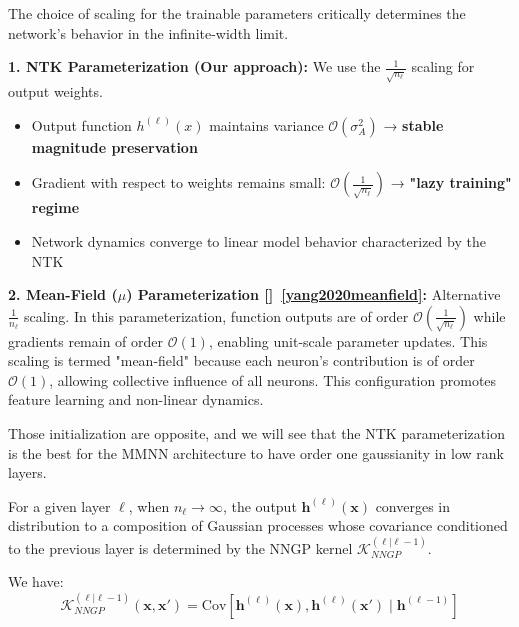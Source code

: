 \documentclass[11pt]{article}
\begin{document}
\begin{tcolorbox}[colback=green!5,colframe=green!80!black,title={\textbf{Remark: Critical Parameterization Choice}},enhanced,drop shadow,boxrule=2pt]
The choice of scaling for the trainable parameters critically determines the network's behavior in the infinite-width limit. 

\textbf{1. NTK Parameterization (Our approach):} We use the $\frac{1}{\sqrt{n_\ell}}$ scaling for output weights.
\begin{itemize}
\item Output function $h^{(\ell)}(x)$ maintains variance $\mathcal{O}(\sigma_A^2)$ → \textbf{stable magnitude preservation}
\item Gradient with respect to weights remains small: $\mathcal{O}(\frac{1}{\sqrt{n_\ell}})$ → \textbf{"lazy training" regime}
\item Network dynamics converge to linear model behavior characterized by the NTK
\end{itemize}

\textbf{2. Mean-Field ($\mu$) Parameterization []~\ref{yang2020meanfield}:} Alternative $\frac{1}{n_\ell}$ scaling.
In this parameterization, function outputs are of order $\mathcal{O}(\frac{1}{\sqrt{n_\ell}})$ while gradients remain of order $\mathcal{O}(1)$, enabling unit-scale parameter updates. This scaling is termed "mean-field" because each neuron's contribution is of order $\mathcal{O}(1)$, allowing collective influence of all neurons. This configuration promotes feature learning and non-linear dynamics.

Those initialization are opposite, and we will see that the NTK parameterization is the best for the MMNN architecture to have order one gaussianity in low rank layers.
\end{tcolorbox}






\begin{tcolorbox}[colback=yellow!5,colframe=yellow!80!black,title={\textbf{Definition: Neural Network Gaussian Process (NNGP)}},enhanced,drop shadow,boxrule=2pt]
For a given layer $\ell$, when $n_\ell \to \infty$, the output $\bm{h}^{(\ell)}(\bm{x})$ converges in 
distribution to a composition of Gaussian processes whose covariance conditioned to the previous layer is determined by the NNGP kernel $\mathcal{K}_{NNGP}^{(\ell | \ell-1)}$.

We have:
\begin{equation}
\mathcal{K}_{NNGP}^{(\ell | \ell-1 )}(\bm{x}, \bm{x}') = \text{Cov}\left[\bm{h}^{(\ell)}(\bm{x}), \bm{h}^{(\ell)}(\bm{x}') \mid \bm{h}^{(\ell-1)}\right]
\end{equation}
\end{tcolorbox}
\end{document}
